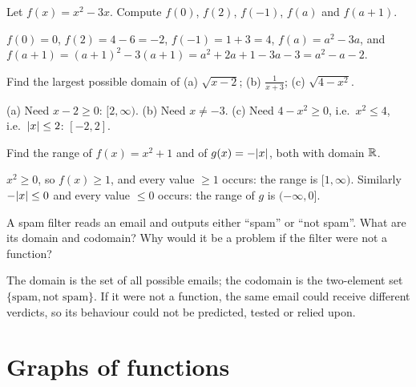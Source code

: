 \begin{exercise}
Let $f(x) = x^2 - 3x$. Compute $f(0)$, $f(2)$, $f(-1)$, $f(a)$ and $f(a+1)$.
\end{exercise}
\begin{solution}
$f(0) = 0$, $f(2) = 4 - 6 = -2$, $f(-1) = 1 + 3 = 4$, $f(a) = a^2 - 3a$, and
$f(a+1) = (a+1)^2 - 3(a+1) = a^2 + 2a + 1 - 3a - 3 = a^2 - a - 2$.
\end{solution}

\begin{exercise}
Find the largest possible domain of (a) $\sqrt{x - 2}$; (b) $\tfrac{1}{x+3}$;
(c) $\sqrt{4 - x^2}$.
\end{exercise}
\begin{solution}
(a) Need $x - 2 \ge 0$: $[2, \infty)$. (b) Need $x \neq -3$.
(c) Need $4 - x^2 \ge 0$, i.e.\ $x^2 \le 4$, i.e.\ $\lvert x\rvert \le 2$: $[-2, 2]$.
\end{solution}

\begin{exercise}
Find the range of $f(x) = x^2 + 1$ and of $g(x) = -\lvert x\rvert$, both with domain
$\mathbb{R}$.
\end{exercise}
\begin{solution}
$x^2 \ge 0$, so $f(x) \ge 1$, and every value $\ge 1$ occurs: the range is
$[1, \infty)$. Similarly $-\lvert x\rvert \le 0$ and every value $\le 0$ occurs: the
range of $g$ is $(-\infty, 0]$.
\end{solution}

\begin{exercise}
A spam filter reads an email and outputs either ``spam'' or ``not spam''.
What are its domain and codomain? Why would it be a problem if the filter
were not a function?
\end{exercise}
\begin{solution}
The domain is the set of all possible emails; the codomain is the two-element
set $\{\text{spam}, \text{not spam}\}$. If it were not a function, the same
email could receive different verdicts, so its behaviour could not be
predicted, tested or relied upon.
\end{solution}

\section{Graphs of functions}\label{sec:graphs}

